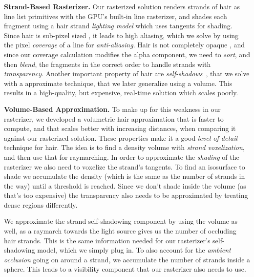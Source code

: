 \documentclass{egpubl}
\begin{document}

\noindent \textbf{Strand-Based Rasterizer. } Our rasterized solution renders strands of hair as line list primitives with the GPU's built-in line rasterizer, and shades each fragment using a hair strand \emph{lighting model} which uses tangents for shading. Since hair is sub-pixel sized \cite{leblanc1991rendering}, it leads to high aliasing, which we solve by using the pixel \emph{coverage} of a line for \emph{anti-aliasing}. Hair is not completely opaque \cite{sintorn2008real}, and since our coverage calculation modifies the alpha component, we need to \emph{sort}, and then \emph{blend}, the fragments in the correct order to handle strands with \emph{transparency}. Another important property of hair are \emph{self-shadows}~\cite{ward2007survey}, that we solve with a approximate technique, that we later generalize using a volume. This results in a high-quality, but expensive, real-time solution which scales poorly.



\noindent \textbf{Volume-Based Approximation. } To make up for this weakness in our rasterizer, we developed a volumetric hair approximation that is faster to compute, and that scales better with increasing distances, when comparing it against our rasterized solution. These properties make it a good \emph{level-of-detail} technique for hair. The idea is to find a density volume with \emph{strand voxelization}, and then use that for raymarching. In order to approximate the \emph{shading} of the rasterizer we also need to voxelize the strand's tangents. To find an isosurface to shade we accumulate the density (which is the same as the number of strands in the way) until a threshold is reached. Since we don't shade inside the volume (as that's too expensive) the transparency also needs to be approximated by treating dense regions differently.

We approximate the strand self-shadowing component by using the volume as well, as a raymarch towards the light source gives us the number of occluding hair strands. This is the same information needed for our rasterizer's self-shadowing model, which we simply plug in. To also account for the \emph{ambient occlusion} going on around a strand, we accumulate the number of strands inside a sphere. This leads to a visibility component that our rasterizer also needs to use.
\end{document}
